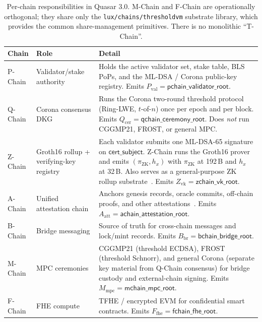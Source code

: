 \begin{table}[ht]
\centering
\small
\begin{tabular}{@{}llp{6.6cm}@{}}
\toprule
\textbf{Chain} & \textbf{Role} & \textbf{Detail} \\
\midrule
P-Chain & Validator/stake authority &
  Holds the active validator set, stake table, BLS PoPs, and the
  ML-DSA / Corona public-key registry. Emits
  $P_\text{val} = \mathsf{pchain\_validator\_root}$. \\[3pt]
Q-Chain & Corona consensus DKG &
  Runs the Corona two-round threshold protocol (Ring-LWE,
  $t$-of-$n$) once per epoch and per block. Emits
  $Q_\text{cer} = \mathsf{qchain\_ceremony\_root}$. Does \emph{not} run
  CGGMP21, FROST, or general MPC. \\[3pt]
Z-Chain & Groth16 rollup + verifying-key registry &
  Each validator submits one ML-DSA-65 signature on
  $\mathsf{cert\_subject}$. Z-Chain runs the Groth16 prover and emits
  $(\pi_{\mathrm{ZK}}, h_x)$ with $\pi_{\mathrm{ZK}}$ at 192\,B and
  $h_x$ at 32\,B. Also serves as a general-purpose ZK rollup
  substrate~\cite{lux-zchain}. Emits
  $Z_\text{vk} = \mathsf{zchain\_vk\_root}$. \\[3pt]
A-Chain & Unified attestation chain &
  Anchors genesis records, oracle commits, off-chain proofs, and other
  attestations~\cite{lux-achain}. Emits
  $A_\text{att} = \mathsf{achain\_attestation\_root}$. \\[3pt]
B-Chain & Bridge messaging &
  Source of truth for cross-chain messages and lock/mint records.
  Emits $B_\text{br} = \mathsf{bchain\_bridge\_root}$. \\[3pt]
M-Chain & MPC ceremonies &
  CGGMP21 (threshold ECDSA), FROST (threshold Schnorr), and general
  Corona (separate key material from Q-Chain consensus) for bridge
  custody and external-chain signing. Emits
  $M_\text{mpc} = \mathsf{mchain\_mpc\_root}$. \\[3pt]
F-Chain & FHE compute &
  TFHE / encrypted EVM for confidential smart contracts. Emits
  $F_\text{fhe} = \mathsf{fchain\_fhe\_root}$. \\
\bottomrule
\end{tabular}
\caption{Per-chain responsibilities in Quasar 3.0. M-Chain and F-Chain
are operationally orthogonal; they share only the
\texttt{lux/chains/thresholdvm} substrate library, which provides the
common share-management primitives. There is no monolithic
``T-Chain''.}
\label{tab:chain-sep}
\end{table}

